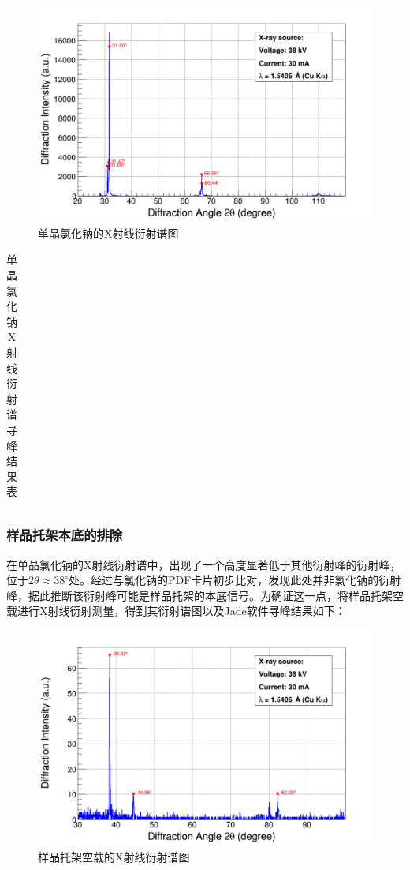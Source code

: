 \documentclass{thuemp}
\begin{document}
\begin{figure}[H]
    \centering
    \includegraphics[options]{../Data/NaCl-single.png}
    \caption{单晶氯化钠的X射线衍射谱图}
    \label{fig:nacl_xrd_single}
\end{figure}

\begin{table}[H]
    \centering
    \captionnamefont{\wuhao\bf\heiti}
    \captiontitlefont{\wuhao\bf\heiti}
    \caption{单晶氯化钠X射线衍射谱寻峰结果表}
    \label{tab:nacl_xrd_single}
    \liuhao
    \begin{tabular}{ccccc}
        \toprule
        \midrule
        \bottomrule
    \end{tabular}
\end{table}

\subsubsection{样品托架本底的排除}

在单晶氯化钠的X射线衍射谱中，出现了一个高度显著低于其他衍射峰的衍射峰，位于$2\theta \approx 38^\circ$处。经过与氯化钠的PDF卡片初步比对，发现此处并非氯化钠的衍射峰，据此推断该衍射峰可能是样品托架的本底信号。为确证这一点，将样品托架空载进行X射线衍射测量，得到其衍射谱图以及Jade软件寻峰结果如下：

\begin{figure}[H]
    \centering
    \includegraphics[options]{../Data/Background-from-manifold.png}
    \caption{样品托架空载的X射线衍射谱图}
    \label{fig:nacl_xrd_holder}
\end{figure}
\end{document}
